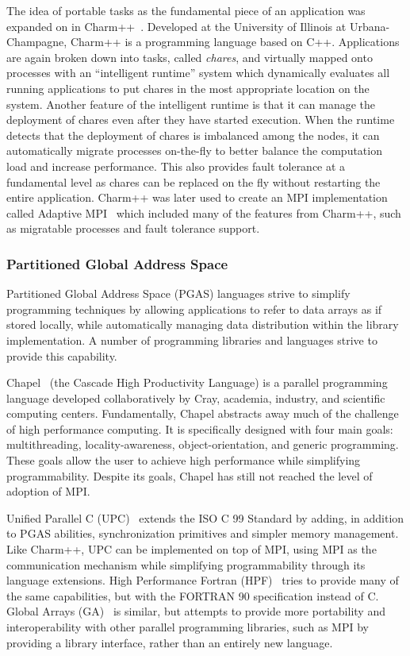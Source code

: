The idea of portable tasks as the fundamental piece of an application was
expanded on in Charm++~\cite{Kale93charm++:a}. Developed at the University of
Illinois at Urbana-Champagne, Charm++ is a programming language based on C++.
Applications are again broken down into tasks, called \textit{chares}, and
virtually mapped onto processes with an ``intelligent runtime'' system which
dynamically evaluates all running applications to put chares in the most
appropriate location on the system. Another feature of the intelligent runtime is that it can
manage the deployment of chares even after they have started execution. When the
runtime detects that the deployment of chares is imbalanced among the nodes, it
can automatically migrate processes on-the-fly to better balance the computation
load and increase performance. This also provides fault tolerance at a
fundamental level as chares can be replaced on the fly without restarting the
entire application. Charm++ was later used to create an MPI implementation
called Adaptive MPI~\cite{AmpiIPDPS00} which included many of the features from 
Charm++, such as migratable processes and fault tolerance support.

\subsubsection{Partitioned Global Address Space}

Partitioned Global Address Space (PGAS) languages strive to simplify programming techniques by allowing applications to refer to data arrays as if stored locally, while automatically managing data distribution within the library implementation. A number of programming libraries and languages strive to provide this capability.

Chapel~\cite{Callahan:2004dg} (the Cascade High Productivity Language) is a
parallel programming language developed collaboratively by Cray, academia,
industry, and scientific computing centers. Fundamentally, Chapel abstracts away
much of the challenge of high performance computing. It is specifically designed
with four main goals: multithreading, locality-awareness, object-orientation,
and generic programming. These goals allow the user to achieve high performance
while simplifying programmability. Despite its goals, Chapel has still not
reached the level of adoption of MPI.

Unified Parallel C (UPC)~\cite{Carlson:1999uf} extends the ISO C 99 Standard by adding, 
in addition to PGAS abilities, synchronization primitives and simpler memory 
management. Like Charm++, UPC can be implemented on top of MPI, using MPI as the 
communication mechanism while simplifying programmability through its language 
extensions. High Performance Fortran (HPF)~\cite{Richardson96highperformance} tries to 
provide many of the same capabilities, but with the FORTRAN 90 specification instead of 
C. Global Arrays (GA)~\cite{GA, Nieplocha:2006vh} is similar, but attempts to provide 
more portability and interoperability with other parallel programming libraries, such 
as MPI by providing a library interface, rather than an entirely new language.


